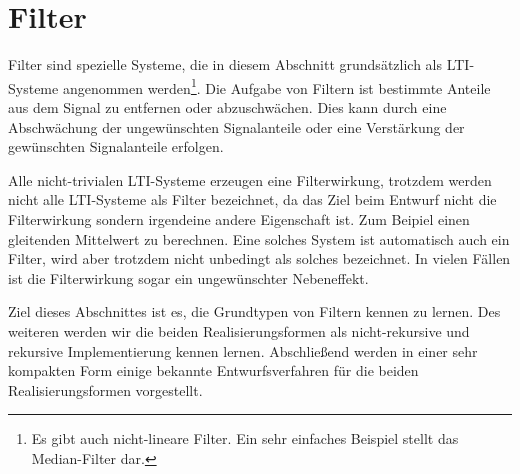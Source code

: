 \chapter{Filter}
Filter sind spezielle Systeme, die in diesem Abschnitt
grundsätzlich als LTI-Systeme angenommen werden\footnote{Es gibt
auch nicht-lineare Filter. Ein sehr einfaches Beispiel stellt das
Median-Filter dar.}. Die Aufgabe von Filtern ist bestimmte Anteile
aus dem Signal zu entfernen oder abzuschwächen. Dies kann durch
eine Abschwächung der ungewünschten Signalanteile oder eine
Verstärkung der gewünschten Signalanteile erfolgen.

Alle nicht-trivialen LTI-Systeme erzeugen eine Filterwirkung,
trotzdem werden nicht alle LTI-Systeme als Filter bezeichnet, da
das Ziel beim Entwurf nicht die Filterwirkung sondern irgendeine
andere Eigenschaft ist. Zum Beipiel einen gleitenden Mittelwert zu
berechnen. Eine solches System ist automatisch auch ein Filter,
wird aber trotzdem nicht unbedingt als solches bezeichnet. In
vielen Fällen ist die Filterwirkung sogar ein ungewünschter
Nebeneffekt.

Ziel dieses Abschnittes ist es, die Grundtypen von Filtern kennen
zu lernen. Des weiteren werden wir die beiden Realisierungsformen
als nicht-rekursive und rekursive Implementierung kennen lernen.
Abschließend werden in einer sehr kompakten Form einige bekannte
Entwurfsverfahren für die beiden Realisierungsformen vorgestellt.

